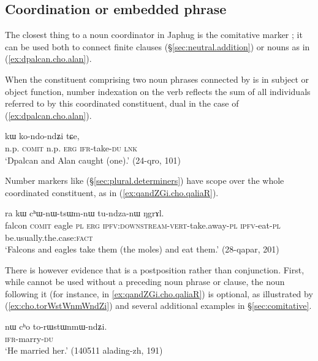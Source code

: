 \subsection{Coordination or embedded phrase} \label{sec:coordinator.cho}
The closest thing to a noun coordinator in Japhug is the comitative marker ; it can be used both to connect finite clauses (§\ref{sec:neutral.addition}) or nouns as in (\ref{ex:dpalcan.cho.alan}). 

When the constituent comprising two noun phrases connected by  is in subject or object function, number indexation on the verb reflects the sum of all individuals referred to by this coordinated constituent,  dual in the case of (\ref{ex:dpalcan.cho.alan}).

 \begin{exe}
\ex \label{ex:dpalcan.cho.alan}
  kɯ ko-ndo-ndʑi tɕe, \\
 n.p. \textsc{comit} n.p. \textsc{erg} \textsc{ifr}-take-\textsc{du} \textsc{lnk} \\
 \glt `Dpalcan and Alan caught (one).' (24-qro, 101)
 \end{exe}
 
Number markers like  (§\ref{sec:plural.determiners}) have scope over the whole coordinated constituent, as in (\ref{ex:qandZGi.cho.qaliaR}).

\begin{exe}
\ex \label{ex:qandZGi.cho.qaliaR}
  ra kɯ cʰɯ-nɯ-tsɯm-nɯ tu-ndza-nɯ ŋgrɤl. \\
falcon \textsc{comit} eagle \textsc{pl} \textsc{erg} \textsc{ipfv}:\textsc{downstream}-\textsc{vert}-take.away-\textsc{pl} \textsc{ipfv}-eat-\textsc{pl} be.usually.the.case:\textsc{fact} \\
\glt `Falcons and eagles take them (the moles) and eat them.' (28-qapar, 201)
\end{exe}

There is however evidence that  is a postposition rather than conjunction. First, while  cannot be used without a preceding noun phrase or clause, the noun following it (for instance,  in \ref{ex:qandZGi.cho.qaliaR}) is optional, as illustrated by (\ref{ex:cho.torWstWnmWndZi}) and several additional examples in §\ref{sec:comitative}.

 \begin{exe}
\ex \label{ex:cho.torWstWnmWndZi}
 \gll nɯ cʰo to-rɯstɯnmɯ-ndʑi. \\
 [\textsc{dem} \textsc{comit}] \textsc{ifr}-marry-\textsc{du} \\
 \glt `He married her.' (140511 alading-zh, 191)
 \end{exe}
 
